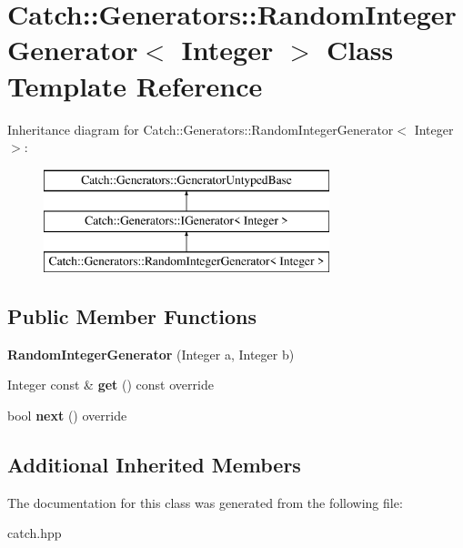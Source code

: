 \hypertarget{classCatch_1_1Generators_1_1RandomIntegerGenerator}{}\section{Catch\+::Generators\+::Random\+Integer\+Generator$<$ Integer $>$ Class Template Reference}
\label{classCatch_1_1Generators_1_1RandomIntegerGenerator}
Inheritance diagram for Catch\+::Generators\+::Random\+Integer\+Generator$<$ Integer $>$\+:\begin{figure}[H]
\begin{center}
\leavevmode
\includegraphics[height=3.000000cm]{classCatch_1_1Generators_1_1RandomIntegerGenerator}
\end{center}
\end{figure}
\subsection*{Public Member Functions}
\begin{DoxyCompactItemize}
\item 
\mbox{\label{classCatch_1_1Generators_1_1RandomIntegerGenerator_a886d16c899ad70781b83a0e8f9d2cf96}} 
{\bfseries Random\+Integer\+Generator} (Integer a, Integer b)
\item 
\mbox{\label{classCatch_1_1Generators_1_1RandomIntegerGenerator_aafbdf9028762f5e8f8ca9c317d686fca}} 
Integer const  \& {\bfseries get} () const override
\item 
\mbox{\label{classCatch_1_1Generators_1_1RandomIntegerGenerator_aaa3db70fbdfa3e8dcb61fb5592eba81f}} 
bool {\bfseries next} () override
\end{DoxyCompactItemize}
\subsection*{Additional Inherited Members}


The documentation for this class was generated from the following file\+:\begin{DoxyCompactItemize}
\item 
catch.\+hpp\end{DoxyCompactItemize}
